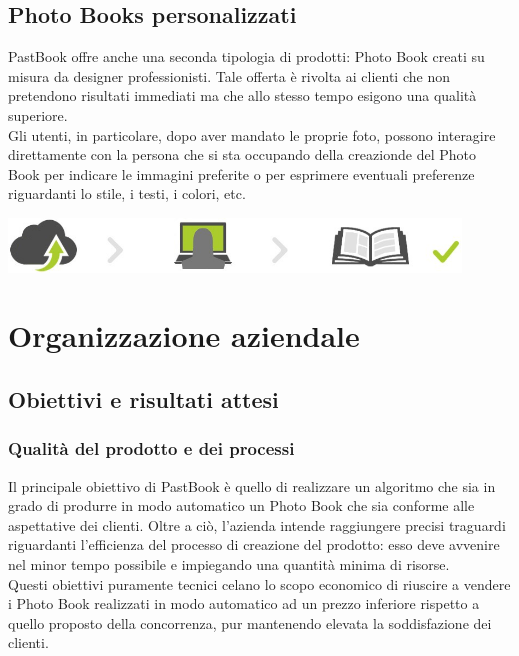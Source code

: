 		\subsection{Photo Books personalizzati}
			PastBook offre anche una seconda tipologia di prodotti: Photo Book creati su misura da designer professionisti. Tale offerta
			è rivolta ai clienti che non pretendono risultati immediati ma che allo stesso tempo esigono una qualità superiore.\\
			Gli utenti, in particolare, dopo aver mandato le proprie foto, possono interagire direttamente con la persona che si sta
			occupando della creazionde del Photo Book per indicare le immagini preferite o per esprimere eventuali preferenze
			riguardanti lo stile, i testi, i colori, etc.
			\begin{center}
				\includegraphics[width=0.9\textwidth]{capitolo_1/immagini/photo_book_personalizzato.png}
			\end{center}
	\section{Organizzazione aziendale}
		\subsection{Obiettivi e risultati attesi}
			\subsubsection{Qualità del prodotto e dei processi}
				Il principale obiettivo di PastBook è quello di realizzare un algoritmo che sia in grado di produrre in modo
				automatico un Photo Book che sia conforme alle aspettative dei clienti. Oltre a ciò, l'azienda intende raggiungere
				precisi traguardi riguardanti l'efficienza del processo di creazione del prodotto: esso deve avvenire nel minor tempo
				possibile e impiegando una quantità minima di risorse.\\
				Questi obiettivi puramente tecnici celano lo scopo economico di riuscire a vendere i Photo Book realizzati in modo
				automatico ad un prezzo inferiore rispetto a quello proposto della concorrenza, pur mantenendo elevata la
				soddisfazione dei clienti.
